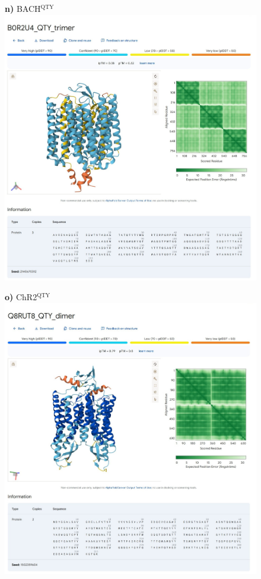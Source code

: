 \documentclass[fleqn,12pt]{supp}
\begin{document}
\newpage
\begin{figure}[H]
    \textbf{n)} BACH$^{\textrm{QTY}}$ \\
    \includegraphics[width=\linewidth]{SuppFigures/af3 bach qty tri.jpg}
\end{figure}

\newpage
\begin{figure}[H]
    \textbf{o)} ChR2$^{\textrm{QTY}}$ \\
    \includegraphics[width=\linewidth]{SuppFigures/af3 chr2 qty di.jpg}
\end{figure}
\end{document}
